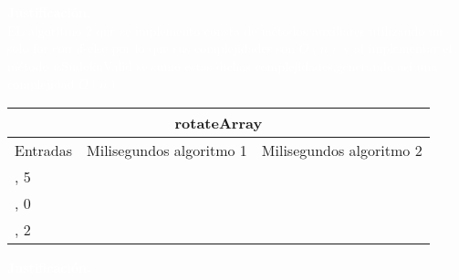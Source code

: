 \documentclass[a4paper,10pt]{article}
\begin{document}
\begin{enumerate}
            \begin{tcolorbox}[colback=black!20!black,colframe=sangria!85!black]
                \textcolor{white}{ \textbf{Justificación.\\}EL algoritmo 2 que se implemento consta de métodos auxiliares utilizando un solo for con if-else por lo que 
                                    sus complejidades son $O(n)$ y al implementar el método isSudokuValid se sumo estas dichas complejidades,generando así una complejidad $O(n)$ }
               \end{tcolorbox} 
               
               
               \begin{table}[htb]
                \centering
                \begin{tabular}{|l|l|l|}
                \hline
                \multicolumn{3}{|c|}{rotateArray} \\ \hline
                Entradas & Milisegundos algoritmo 1 & Milisegundos algoritmo 2 \\
                \hline \hline
                [1,4,2,1,6,2,9], 5 & \hspace{1.3cm}{$\approx 37$}  & \hspace{1.3cm}{$\approx _$} \\ \hline
                [4,2,7,5,4,3,7,2,5,3,4,1], 0 & \hspace{1.3cm}{$\approx 37$} & \hspace{1.3cm}{$\approx _$} \\ \hline
                [3,2,1,4,2], 2 & \hspace{1.3cm}{$\approx 37$} & \hspace{1.3cm}{$\approx _$} \\ \hline
                \end{tabular}
                \end{table}  
                
                \begin{tcolorbox}[colback=black!20!black,colframe=green(ncs)!85!black]
                    \textcolor{white}{ \textbf{Justificación.}}
                   \end{tcolorbox} 
                       
                 

\end{enumerate}
\end{document}
